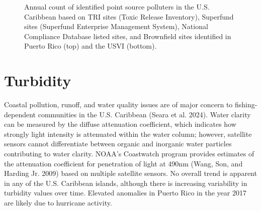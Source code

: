 \documentclass[
  letterpaper,
  oneside,
  open=any]{scrbook}
\begin{document}
\begin{figure}


\caption{\label{fig-pollution}Annual count of identified point source
polluters in the U.S. Caribbean based on TRI sites (Toxic Release
Inventory), Superfund sites (Superfund Enterprise Management System),
National Compliance Database listed sites, and Brownfield sites
identified in Puerto Rico (top) and the USVI (bottom).}

\end{figure}%

\section{Turbidity}\label{turbidity}

Coastal pollution, runoff, and water quality issues are of major concern
to fishing-dependent communities in the U.S. Caribbean (Seara et al.
2024). Water clarity can be measured by the diffuse attenuation
coefficient, which indicates how strongly light intensity is attenuated
within the water column; however, satellite sensors cannot differentiate
between organic and inorganic water particles contributing to water
clarity. NOAA's Coastwatch program provides estimates of the attenuation
coefficient for penetration of light at 490nm (Wang, Son, and Harding
Jr. 2009) based on multiple satellite sensors. No overall trend is
apparent in any of the U.S. Caribbean islands, although there is
increasing variability in turbidity values over time. Elevated anomalies
in Puerto Rico in the year 2017 are likely due to hurricane activity.
\end{document}
